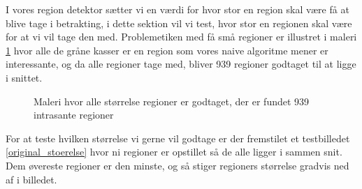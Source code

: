 I vores region detektor sætter vi en værdi for hvor stor en region skal
være få at blive tage i betrakting, i dette sektion vil vi test,
hvor stor en regionen skal være for at vi vil tage den med. Problemetiken
med få små regioner er illustret i maleri \ref{alt_med} hvor alle de
gråne kasser er en region som vores naive algoritme mener er
interessante, og da alle regioner tage med, bliver 939 regioner godtaget
til at ligge i snittet.

\begin{figure}[¡h]
    \setlength\fboxsep{0pt}
    \setlength\fboxrule{0.5pt}
    \begin{center}
    \end{center}
    \caption{Maleri hvor alle størrelse regioner er godtaget, der er fundet 939 intrasante regioner}
	\label{alt_med}
\end{figure}

For at teste hvilken størrelse vi gerne vil godtage er der fremstilet et
testbilledet \ref{original_stoerelse} hvor ni regioner er opstillet så de
alle ligger i sammen snit. Dem øvereste regioner er den minste, og så
stiger regioners størrelse gradvis ned af i billedet.


